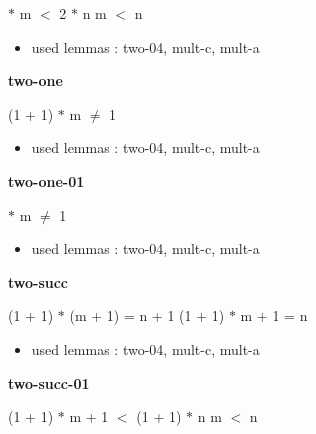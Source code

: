 \documentclass[a4paper]{article}
\begin{document}
\medskip

  $*$ m $<$ 2 $*$ n \Equiv m $<$ n

\begin{itemize}


\item       used lemmas  : two-04, mult-c, mult-a

\end{itemize}

\medskip

\bigskip

{\large\bf two-one}

\medskip

 \Fol (1 + 1) $*$ m $\neq$ 1

\begin{itemize}


\item       used lemmas  : two-04, mult-c, mult-a

\end{itemize}

\medskip

\bigskip

{\large\bf two-one-01}

\medskip

  $*$ m $\neq$ 1

\begin{itemize}


\item       used lemmas  : two-04, mult-c, mult-a

\end{itemize}

\medskip

\bigskip

{\large\bf two-succ}

\medskip

 \Fol (1 + 1) $*$ (m + 1) = n + 1 \Equiv (1 + 1) $*$ m + 1 = n

\begin{itemize}


\item       used lemmas  : two-04, mult-c, mult-a

\end{itemize}

\medskip

\bigskip

{\large\bf two-succ-01}

\medskip

 \Fol (1 + 1) $*$ m + 1 $<$ (1 + 1) $*$ n \Equiv m $<$ n
\end{document}
